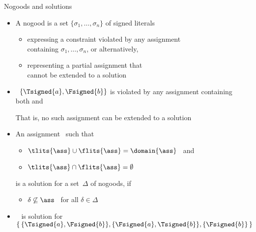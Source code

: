 \begin{frame}{Nogoods and solutions}
  \bigskip
  \begin{itemize}
  \item<2-> A \alert{nogood} is a set $\{\sigma_1,\ldots,\sigma_n\}$ of signed literals
    \begin{itemize}\normalsize
    \item<only@3-5> expressing a \alert{constraint} violated by any assignment
      \\containing $\sigma_1,\ldots,\sigma_n$, or alternatively,
    \item<only@3-5> representing a partial assignment that
      \\cannot be extended to a solution
      \medskip
    \end{itemize}
  \item<only@4 >  \ $\{\Tsigned{a},\Fsigned{b}\}$
    is violated by any assignment containing
    \\ both  and 
    \par\smallskip
    That is, no such assignment can be extended to a solution
  \item<only@5-> An assignment \ass\ such that
    \par\smallskip
    \begin{itemize}\normalsize
    \item \( \tlits{\ass} \cup \flits{\ass} = \domain{\ass} \) \ and
      \smallskip
    \item \( \tlits{\ass} \cap \flits{\ass} = \emptyset \)
    \end{itemize}
    \par\smallskip
    is a \alert{solution} for a set~$\Delta$ of nogoods,
    if
    \par\smallskip
    \begin{itemize}\normalsize
    \item $\delta\not\subseteq\ass$ \ for all $\delta\in\Delta$
    \end{itemize}
    \bigskip
  \item<only@7- >  \ 
    is  solution for
    \(
    \{\,\{\Tsigned{a},\Fsigned{b}\},\{\Fsigned{a},\Tsigned{b}\},\{\Fsigned{b}\}\,\}
    \)
  \end{itemize}
\end{frame}
